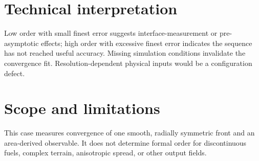 \section{Technical interpretation}

Low order with small finest error suggests interface-measurement or pre-asymptotic effects; high order with excessive finest error indicates the sequence has not reached useful accuracy. Missing simulation conditions invalidate the convergence fit. Resolution-dependent physical inputs would be a configuration defect.

\section{Scope and limitations}

This case measures convergence of one smooth, radially symmetric front and an area-derived observable. It does not determine formal order for discontinuous fuels, complex terrain, anisotropic spread, or other output fields.

